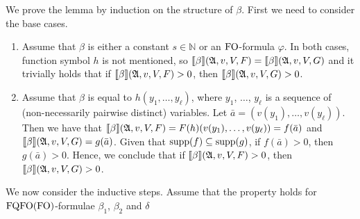 
We prove the lemma by induction on the structure of $\beta$. First we need to consider the base cases.
\begin{enumerate}
\item Assume that $\beta$ is either a constant $s \in \mathbb{N}$ or an ${\rm FO}$-formula $\varphi$. In both cases, function symbol $h$ is not mentioned, so ${\llbracket{}{\beta}\rrbracket}(\mathfrak{A},v,V,F) = {\llbracket{}{\beta}\rrbracket}(\mathfrak{A},v,V,G)$ and it trivially holds that if ${\llbracket{}{\beta}\rrbracket}(\mathfrak{A},v,V,F) > 0$, then ${\llbracket{}{\beta}\rrbracket}(\mathfrak{A},v,V,G) > 0$.

\item Assume that $\beta$ is equal to $h(y_1, \ldots, y_\ell)$, where $y_1$, $\ldots$, $y_\ell$ is a sequence of (non-necessarily pairwise distinct) variables. Let $\bar a = (v(y_1), \ldots, v(y_\ell))$. Then we have that ${\llbracket{}{\beta}\rrbracket}(\mathfrak{A},v,V,F) = F(h)(v(y_1), \ldots, v(y_\ell)) = f(\bar a)$ and ${\llbracket{}{\beta}\rrbracket}(\mathfrak{A},v,V,G) = g(\bar a)$. Given that $\text{\rm supp}(f) \subseteq \text{\rm supp}(g)$, if $f(\bar a) > 0$, then $g(\bar a) > 0$. Hence, we conclude that if ${\llbracket{}{\beta}\rrbracket}(\mathfrak{A},v,V,F) > 0$, then ${\llbracket{}{\beta}\rrbracket}(\mathfrak{A},v,V,G) > 0$.
\end{enumerate}
We now consider the inductive steps. Assume that the property holds for ${\rm FQFO}({\rm FO})$-formulae $\beta_1$, $\beta_2$ and $\delta$

